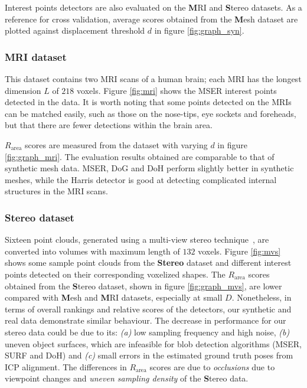 Interest points detectors are also evaluated on the {\textbf MRI} and {\textbf Stereo} datasets.
As a reference for cross validation, average scores obtained from the {\textbf Mesh} dataset are plotted against displacement threshold $d$ in figure \ref{fig:graph_syn}. 
  
\subsubsection{MRI dataset} This dataset contains two MRI scans of a human brain; each MRI has the longest dimension $L$ of $218$ voxels.
Figure \ref{fig:mri} shows the MSER interest points detected in the data. It is worth noting that some points detected on the MRIs can be matched easily, such as those on the nose-tips, eye sockets and foreheads, but that there are fewer detections within the brain area.

$R_{\textrm{area}}$ scores are measured from the dataset with varying $d$ in figure \ref{fig:graph_mri}. The evaluation results obtained are comparable to that of synthetic mesh data. MSER, DoG and DoH perform slightly better in synthetic meshes, while the Harris detector is good at detecting complicated internal structures in the MRI scans. 

\subsubsection{Stereo dataset} 
Sixteen point clouds,
generated using a multi-view stereo technique~\cite{Vogiatzis2011},
are converted into volumes with maximum length of $132$ voxels. Figure \ref{fig:mvs} shows some sample point clouds from the \textbf{Stereo} dataset and different interest points detected on their corresponding voxelized shapes.
The $R_{\textrm{area}}$ scores obtained from the {\textbf Stereo} dataset, shown in figure \ref{fig:graph_mvs}, are lower compared with {\textbf Mesh} and {\textbf MRI} datasets, especially at small $D$. Nonetheless, in terms of overall rankings and relative scores of the detectors, our synthetic and real data demonstrate similar behaviour. The decrease in performance for our stereo data could be due to its: \emph{(a)} low sampling frequency and high noise, \emph{(b)} uneven object surfaces, which are infeasible for blob detection algorithms (\eg MSER, SURF and DoH) and \emph{(c)} small errors in the estimated ground truth poses from ICP alignment.
The differences in $R_{\textrm{area}}$ scores are due to \emph{occlusions} due to viewpoint changes and \emph{uneven sampling density} of the {\textbf Stereo} data. 
 
